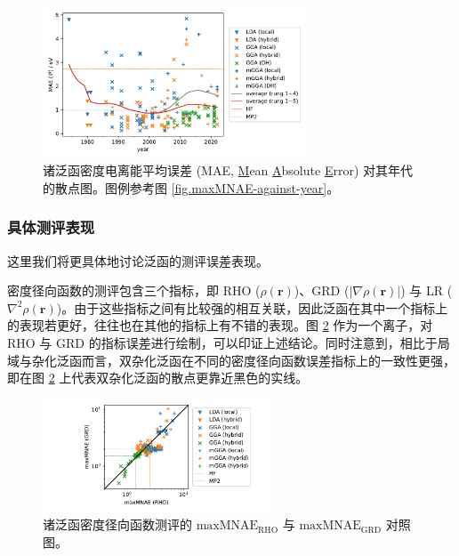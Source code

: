 \begin{figure}[t]
    \centering
    \caption{诸泛函密度电离能平均误差 (MAE, \underline{M}ean \underline{A}bsolute \underline{E}rror) 对其年代的散点图。图例参考图 \ref{fig.maxMNAE-against-year}。}
    \label{fig.MAE-etot-against-year}
    \includegraphics[width=0.7\textwidth]{assets/MAE-etot-against-year.pdf}
\end{figure}

\subsubsection{具体测评表现}

这里我们将更具体地讨论泛函的测评误差表现。

密度径向函数的测评包含三个指标，即 RHO ($\rho(\bm{r})$)、GRD ($|\nabla \rho(\bm{r})|$) 与 LR ($\nabla^2 \rho(\bm{r})$)。由于这些指标之间有比较强的相互关联，因此泛函在其中一个指标上的表现若更好，往往也在其他的指标上有不错的表现。图 \ref{fig.compare-err-RHO-GRD} 作为一个离子，对 RHO 与 GRD 的指标误差进行绘制，可以印证上述结论。同时注意到，相比于局域与杂化泛函而言，双杂化泛函在不同的密度径向函数误差指标上的一致性更强，即在图 \ref{fig.compare-err-RHO-GRD} 上代表双杂化泛函的散点更靠近黑色的实线。

\begin{figure}[t]
    \centering
    \caption{诸泛函密度径向函数测评的 $\text{maxMNAE}_\text{RHO}$ 与 $\text{maxMNAE}_\text{GRD}$ 对照图。}
    \label{fig.compare-err-RHO-GRD}
    \includegraphics[width=0.6\textwidth]{assets/compare-err-RHO-GRD.pdf}
\end{figure}

